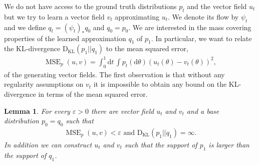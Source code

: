 \documentclass{article}
\newtheorem{lemma}{Lemma}
\theoremstyle{remark}
\newcommand{\eps}{\varepsilon}
\renewcommand{\d}{\mathrm{d}}
\newcommand{\KL}{\mathrm{D_{KL}}}
\DeclareMathOperator{\MSE}{MSE}
\begin{document}
We do not have access to the ground truth distributions $p_t$ and the vector field $u_t$ but we try to learn a vector field $v_t$ approximating $u_t$.
We denote its flow by $\psi_t$ and we define
$q_t = (\psi_t)_\ast q_0$ and $q_0=p_0$.
We are interested in the mass covering properties 
of the learned approximation $q_1$ of $p_1$. In particular,
we want to relate the KL-divergence 
$\KL(p_1||q_1)$ to the mean squared error,
\begin{align}
    \MSE_p(u,v)=\int_0^1 \d t\, \int p_t(\d\theta)(u_t(\theta)-v_t(\theta))^2,
\end{align}
of the generating vector fields.
The first observation is that without any 
regularity assumptions on $v_t$ it is impossible to 
obtain any bound on the KL-divergence in terms of the mean squared error.

\begin{lemma}\label{le:holes}
    For every $\eps>0$ there are  vector field $u_t$
    and $v_t$ and a base distribution $p_0=q_0$ such that 
    \begin{align}
        \MSE_p(u,v)<\eps \text{  and   } 
        \KL(p_1||q_1)=\infty.
    \end{align}
    In addition we can construct $u_t$ and $v_t$ such that the support of $p_1$ is larger than the support of $q_1$.
\end{lemma}
\end{document}
